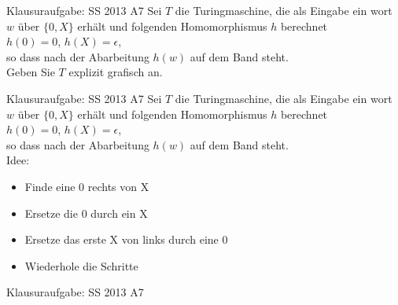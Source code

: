 \begin{frame}{Klausuraufgabe: SS 2013 A7}
  Sei $T$ die Turingmaschine, die als Eingabe ein wort $w$ über $\{0,X\}$ erhält und folgenden Homomorphismus $h$ berechnet\\
  $h(0)=0$, $h(X)=\epsilon$,\\
  so dass nach der Abarbeitung $h(w)$ auf dem Band steht.\\
  Geben Sie $T$ explizit grafisch an.
\end{frame}

\begin{frame}{Klausuraufgabe: SS 2013 A7}
  Sei $T$ die Turingmaschine, die als Eingabe ein wort $w$ über $\{0,X\}$ erhält und folgenden Homomorphismus $h$ berechnet\\
  $h(0)=0$, $h(X)=\epsilon$,\\
  so dass nach der Abarbeitung $h(w)$ auf dem Band steht.\\
  Idee:
  \begin{itemize}
    \item Finde eine 0 rechts von X
    \item Ersetze die 0 durch ein X
    \item Ersetze das erste X von links durch eine 0
    \item Wiederhole die Schritte
  \end{itemize}
\end{frame}

\begin{frame}{Klausuraufgabe: SS 2013 A7}
  \begin{center}
  \end{center}
\end{frame}

